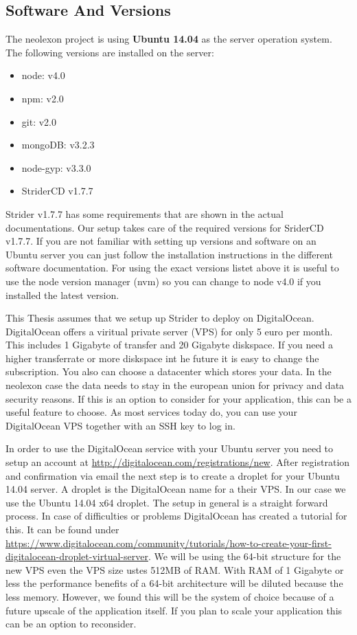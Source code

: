 \subsection{Software And Versions}
The neolexon project is using \textbf{Ubuntu 14.04} as the server operation system. The following versions are installed on the server:
\begin{itemize}
  \item node: v4.0
  \item npm: v2.0
  \item git: v2.0
  \item mongoDB: v3.2.3
  \item node-gyp: v3.3.0
  \item StriderCD v1.7.7
\end{itemize}

Strider v1.7.7 has some requirements that are shown in the actual documentations. Our setup takes care of the required versions for SriderCD v1.7.7.
If you are not familiar with setting up versions and software on an Ubuntu server you can just follow the installation instructions in the different
software documentation. For using the exact versions listet above it is useful to use the node version manager (nvm) so you can change to node v4.0 if
you installed the latest version.

This Thesis assumes that we setup up Strider to deploy on DigitalOcean. DigitalOcean offers a viritual private server (VPS) for only 5 euro per month. This
includes 1 Gigabyte of transfer and 20 Gigabyte diskspace. If you need a higher transferrate or more diskspace int he future it is easy to change the
subscription. You also can choose a datacenter which stores your data. In the neolexon case the data needs to stay in the european union for privacy
and data security reasons. If this is an option to consider for your application, this can be a useful feature to choose. As most services today do, you
can use your DigitalOcean VPS together with an SSH key to log in.

In order to use the DigitalOcean service with your Ubuntu server you need to setup an account at \url{http://digitalocean.com/registrations/new}. After
registration and confirmation via email the next step is to create a droplet for your Ubuntu 14.04 server. A droplet is the DigitalOcean name for a  their VPS.
In our case we use the Ubuntu 14.04 x64 droplet. The setup in general is a straight forward process. In case of difficulties or problems DigitalOcean has
created a tutorial for this. It can be found under \url{https://www.digitalocean.com/community/tutorials/how-to-create-your-first-digitalocean-droplet-virtual-server}.
We will be using the 64-bit structure for the new VPS even the VPS size ustes 512MB of RAM. With RAM of 1 Gigabyte or less the performance benefits of a 64-bit architecture
will be diluted because the less memory. However, we found this will be the system of choice because of a future upscale of the application itself. If you plan
to scale your application this can be an option to reconsider.


